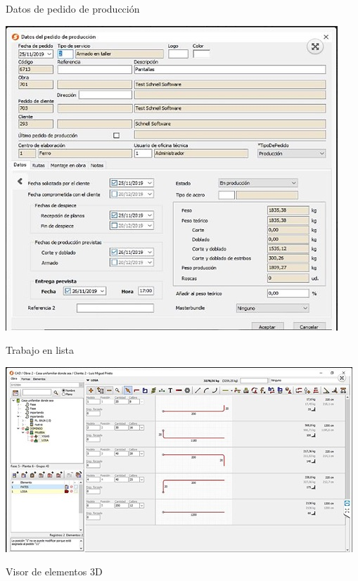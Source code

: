 \documentclass[10pt,a4paper]{article}
\begin{document}
\begin{enumerate}
\begin{center}
Datos de pedido de producción
\end{center}

\includegraphics[scale=1]{GRAPHICO PRO 2.JPG}

\begin{center}
Trabajo en lista
\end{center}

\includegraphics[scale=1]{GRAPHICO PRO - Trabajo en lista.JPG}

\begin{center}
Visor de elementos 3D
\end{center}


\end{enumerate}
\end{document}
